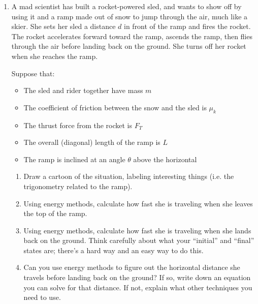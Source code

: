 \documentclass[12pt]{article}
\begin{document}
\Large
\centerline{}
\normalsize
\centerline{}

\begin{enumerate}


\item A mad scientist has built a rocket-powered sled, and wants to show off by using it and a ramp made out of
snow to jump through the air, much like a skier. She sets her sled a distance $d$ in front of the ramp
and fires the rocket. The rocket accelerates forward toward the ramp, ascends the ramp, then flies through
the air before landing back on the ground. She turns off her rocket when she reaches the ramp.

Suppose that:

\begin{itemize}
\item The sled and rider together have mass $m$
\item The coefficient of friction between the snow and the sled is $\mu_k$
\item The thrust force from the rocket is $F_T$
\item The overall (diagonal) length of the ramp is $L$
\item The ramp is inclined at an angle $\theta$ above the horizontal
\end{itemize}

\begin{enumerate}

\item Draw a cartoon of the situation, labeling interesting things (i.e. the trigonometry related to the ramp).

\vspace{2in}

\item Using energy methods, calculate how fast she is traveling when she leaves the top of the ramp.

\vspace{2in}
\newpage
\item Using energy methods, calculate how fast she is traveling when she lands back on the ground. Think 
carefully about what your ``initial'' and ``final'' states are; there's a hard way and an easy way to do this.

\vspace{3in}

\item Can you use energy methods to figure out the horizontal distance she travels before landing back
on the ground? If so, write down an equation you can solve for that distance. If not, explain what other
techniques you need to use.
\end{enumerate}
\newpage




\end{enumerate}
\end{document}

